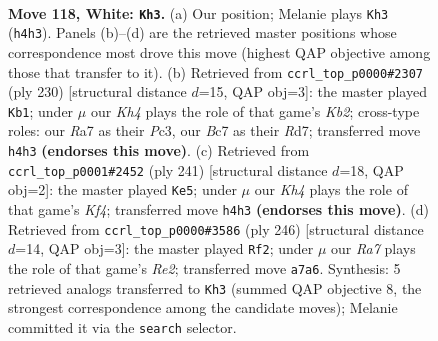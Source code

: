 \documentclass[11pt]{article}
\begin{document}
\clearpage

\begin{figure}[p]\centering
\begin{subfigure}{0.46\textwidth}\centering
\resizebox{\linewidth}{!}{%
\newchessgame
\chessboard[
  setfen={6r1/R1B4k/8/P7/7K/8/8/8 w - - 5 118},
  showmover=false,
  pgfstyle=straightmove, color=movearrow, markmove={h4-h3}
]}
\caption{}
\end{subfigure}\hfill
\begin{subfigure}{0.46\textwidth}\centering
\resizebox{\linewidth}{!}{%
\newchessgame
\chessboard[
  setfen={8/P2R4/r7/1k6/8/2P5/1K6/8 w - - 23 116},
  showmover=false,
  pgfstyle=straightmove, color=movearrow, markmove={b2-b1}
]}
\caption{}
\end{subfigure}
\\[4pt]
\begin{subfigure}{0.46\textwidth}\centering
\resizebox{\linewidth}{!}{%
\newchessgame
\chessboard[
  setfen={8/p1r1b3/2B4R/5k2/8/8/4K3/8 b - - 37 121},
  showmover=false,
  pgfstyle=straightmove, color=movearrow, markmove={f5-e5}
]}
\caption{}
\end{subfigure}\hfill
\begin{subfigure}{0.46\textwidth}\centering
\resizebox{\linewidth}{!}{%
\newchessgame
\chessboard[
  setfen={2r5/1k6/7P/3K4/8/4B3/2b1R3/8 w - - 13 124},
  showmover=false,
  pgfstyle=straightmove, color=movearrow, markmove={e2-f2}
]}
\caption{}
\end{subfigure}
\caption{\textbf{Move 118, White: \texttt{Kh3}.} (a) Our position; Melanie plays \texttt{Kh3} (\texttt{h4h3}). Panels (b)--(d) are the retrieved master positions whose correspondence most drove this move (highest QAP objective among those that transfer to it). (b) Retrieved from \texttt{ccrl\_top\_p0000\#2307} (ply 230) [structural distance $d$=15, QAP obj=3]: the master played \texttt{Kb1}; under $\mu$ our \emph{Kh4} plays the role of that game's \emph{Kb2}; cross-type roles: our \emph{R}a7 as their \emph{P}c3, our \emph{B}c7 as their \emph{R}d7; transferred move \texttt{h4h3} \textbf{(endorses this move)}. (c) Retrieved from \texttt{ccrl\_top\_p0001\#2452} (ply 241) [structural distance $d$=18, QAP obj=2]: the master played \texttt{Ke5}; under $\mu$ our \emph{Kh4} plays the role of that game's \emph{Kf4}; transferred move \texttt{h4h3} \textbf{(endorses this move)}. (d) Retrieved from \texttt{ccrl\_top\_p0000\#3586} (ply 246) [structural distance $d$=14, QAP obj=3]: the master played \texttt{Rf2}; under $\mu$ our \emph{Ra7} plays the role of that game's \emph{Re2}; transferred move \texttt{a7a6}. Synthesis: 5 retrieved analogs transferred to \texttt{Kh3} (summed QAP objective 8, the strongest correspondence among the candidate moves); Melanie committed it via the \texttt{search} selector.}
\label{fig:thought-m234}
\end{figure}
\end{document}
